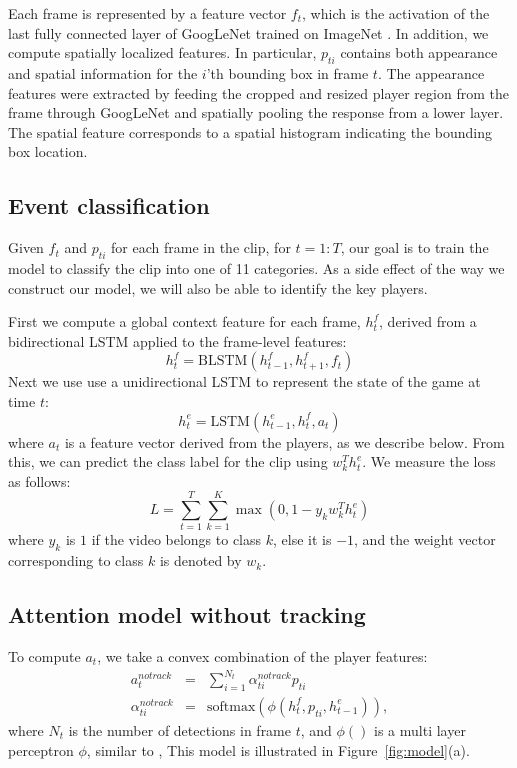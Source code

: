 Each frame  is represented by a feature vector $f_t$, which is the activation of the last fully connected layer of
GoogLeNet \cite{} trained on ImageNet \cite{}.  
In addition, we compute spatially localized features.
In particular, $p_{ti}$ 
contains both appearance and spatial information for the $i$'th
bounding box in frame $t$. The appearance features were
extracted by feeding the cropped and resized player region from the frame
through GoogLeNet and spatially pooling the response from a lower layer. The
spatial feature corresponds to a spatial histogram indicating the bounding box
location.  



\subsection{Event classification}

Given $f_t$ and $p_{ti}$ for each frame in the clip, for $t=1:T$, our goal is to
train the model to classify the clip into one of 11 categories. As a
side effect of the way we construct our model, we will also be able to
identify the key players.

First we compute a global context feature for each frame, $h_t^f$, derived 
from a bidirectional LSTM applied to the
frame-level features:
\[
h_t^f = \mbox{BLSTM}(h_{t-1}^f, h_{t+1}^f, f_t)
\]
Next we use use a unidirectional LSTM to represent the state of the
game at time $t$:
\[
h_t^e = \mbox{LSTM}(h_{t-1}^e, h_t^f, a_t)
\]
where $a_t$ is a feature vector derived from the players, as we
describe below.
From this, we can predict the class label for the clip using $w_k^T
h_t^e$. We measure the loss as follows:
\begin{equation}
  L = \sum_{t=1}^T \sum_{k = 1}^K \max (0, 1 - y_k w_k^T h^e_t)
\end{equation} 
where $y_k$ is $1$ if the video belongs to class $k$,
else it is $-1$, and the weight vector corresponding to
class $k$ is denoted by $w_k$.

\subsection{Attention model without tracking}

To compute $a_t$, we take a convex combination of the player features:
\begin{eqnarray} 
\label{eq:notrack}
  a_t^{notrack} & = & \sum_{i=1}^{N_t} \alpha_{ti}^{notrack} p_{ti} 
\\ \nonumber
  \alpha_{ti}^{notrack} & = & \text{softmax} \left(\phi\left(h^f_t, p_{ti}, h^e_{t-1}\right)\right),
\end{eqnarray}
where $N_t$ is the number of detections in frame $t$, 
and $\phi()$ is a 
multi layer perceptron $\phi$, similar to
\cite{Bahdnau_arxiv14},
This model is illustrated in Figure~\ref{fig:model}(a).




